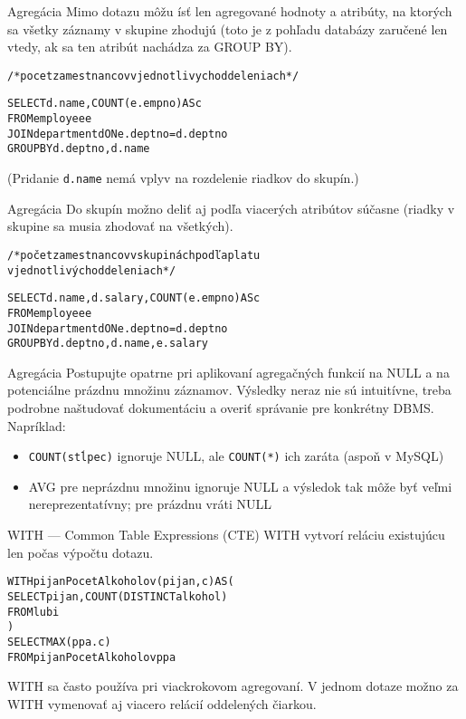 \documentclass[12pt]{beamer}
\def\blue#1{\textcolor{Cerulean}{#1}}
\begin{document}
\begin{frame}[fragile]{Agregácia}
Mimo dotazu môžu ísť len agregované hodnoty a atribúty, na ktorých sa všetky záznamy v skupine zhodujú
(toto je z pohľadu databázy zaručené len vtedy, ak sa ten atribút nachádza za GROUP BY).
\begin{alltt}
/* pocet zamestnancov v jednotlivych oddeleniach */

SELECT \blue{d.name}, \alert{COUNT}(e.empno) AS c
FROM employee e
    JOIN department d ON e.deptno = d.deptno
\alert{GROUP BY} d.deptno, \blue{d.name}
\end{alltt}
(Pridanie \verb|d.name| nemá vplyv na rozdelenie riadkov do skupín.)
\end{frame}

\begin{frame}[fragile]{Agregácia}
Do skupín možno deliť aj podľa viacerých atribútov súčasne (riadky v skupine sa musia zhodovať na všetkých).
\begin{alltt}
/* počet zamestnancov v skupinách podľa platu
v jednotlivých oddeleniach */

SELECT d.name, d.salary, \alert{COUNT}(e.empno) AS c
FROM employee e
    JOIN department d ON e.deptno = d.deptno
\alert{GROUP BY} d.deptno, d.name, e.salary
\end{alltt}
\end{frame}

\begin{frame}[fragile]{Agregácia}
Postupujte opatrne pri aplikovaní agregačných funkcií na NULL a na potenciálne prázdnu množinu záznamov.
Výsledky neraz nie sú intuitívne, treba podrobne naštudovať dokumentáciu a overiť správanie pre konkrétny DBMS.
Napríklad:
\begin{itemize}
\item \verb|COUNT(stĺpec)| ignoruje NULL, ale \verb|COUNT(*)| ich zaráta (aspoň v MySQL)
\item AVG pre neprázdnu množinu ignoruje NULL a výsledok tak môže byť veľmi nereprezentatívny; pre prázdnu vráti NULL
\end{itemize}
\end{frame}

\begin{frame}[fragile]{WITH --- Common Table Expressions (CTE)}
WITH vytvorí reláciu existujúcu len počas výpočtu dotazu.
\bigskip
\begin{alltt}
\alert{WITH} \blue{pijanPocetAlkoholov}(pijan, c) AS (
    SELECT pijan, COUNT(DISTINCT alkohol)
    FROM lubi
)
SELECT MAX(ppa.c)
FROM \blue{pijanPocetAlkoholov} ppa
\end{alltt}
\bigskip
WITH sa často používa pri viackrokovom agregovaní.
V jednom dotaze možno za WITH vymenovať aj viacero relácií oddelených čiarkou.
\end{frame}
\end{document}
